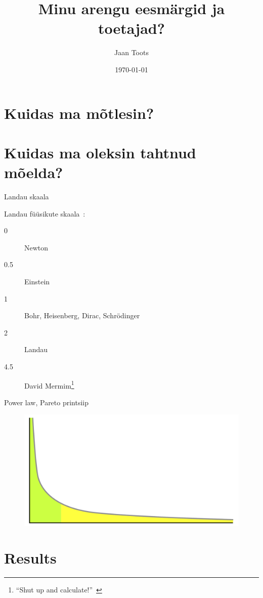 \documentclass{beamer}
\title{Minu arengu eesmärgid ja toetajad?}
\author{Jaan Toots}
\date{\today}
\begin{document}
\maketitle

\section{Kuidas ma mõtlesin?}

\section{Kuidas ma oleksin tahtnud mõelda?}

\begin{frame}{Landau skaala}

  Landau füüsikute skaala~\cite{hey1997einstein}:
  \begin{description}
  \item[0] Newton
  \item[0.5] Einstein
  \item[1] Bohr, Heisenberg, Dirac, Schrödinger
  \item[2] Landau
  \item[4.5] David Mermim\footnote{``Shut up and
      calculate!''~\cite{mermin2004could}}
  \end{description}

\end{frame}

\begin{frame}{Power law, Pareto printsiip}

  \begin{figure}[h]
    \includegraphics[width=\textwidth]{long_tail.pdf}
  \end{figure}

\end{frame}

\section{Results}
\end{document}
